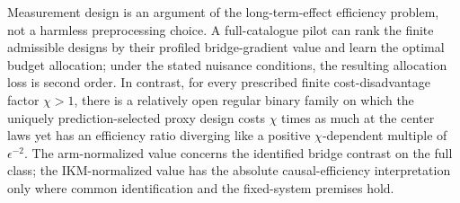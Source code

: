 Measurement design is an argument of the long-term-effect efficiency problem, not a harmless preprocessing choice. A full-catalogue pilot can rank the finite admissible designs by their profiled bridge-gradient value and learn the optimal budget allocation; under the stated nuisance conditions, the resulting allocation loss is second order. In contrast, for every prescribed finite cost-disadvantage factor \(\chi>1\), there is a relatively open regular binary family on which the uniquely prediction-selected proxy design costs \(\chi\) times as much at the center laws yet has an efficiency ratio diverging like a positive \(\chi\)-dependent multiple of \(\epsilon^{-2}\). The arm-normalized value concerns the identified bridge contrast on the full class; the IKM-normalized value has the absolute causal-efficiency interpretation only where common identification and the fixed-system premises hold.